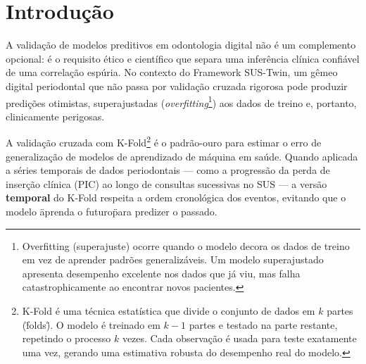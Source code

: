 

\section{Introdução}
\label{ch:ia}

A validação de modelos preditivos em odontologia digital não é um
complemento opcional: é o requisito ético e científico que separa uma
inferência clínica confiável de uma correlação espúria. No contexto do
Framework SUS-Twin, um gêmeo digital periodontal que não passa por
validação cruzada rigorosa pode produzir predições otimistas,
superajustadas (\textit{overfitting}\footnote{Overfitting (superajuste)
ocorre quando o modelo decora os dados de treino em vez de aprender
padrões generalizáveis. Um modelo superajustado apresenta desempenho
excelente nos dados que já viu, mas falha catastrophicamente ao
encontrar novos pacientes.}) aos dados de treino e, portanto,
clinicamente perigosas.

A validação cruzada com K-Fold\footnote{K-Fold é uma técnica
estatística que divide o conjunto de dados em $k$ partes (\"folds\").
O modelo é treinado em $k-1$ partes e testado na parte restante,
repetindo o processo $k$ vezes. Cada observação é usada para teste
exatamente uma vez, gerando uma estimativa robusta do desempenho real
do modelo.} é o padrão-ouro para estimar o erro de generalização de
modelos de aprendizado de máquina em saúde. Quando aplicada a séries
temporais de dados periodontais --- como a progressão da perda de
inserção clínica (PIC) ao longo de consultas sucessivas no SUS --- a
versão \textbf{temporal} do K-Fold respeita a ordem cronológica dos
eventos, evitando que o modelo \"aprenda o futuro\" para predizer o
passado.

